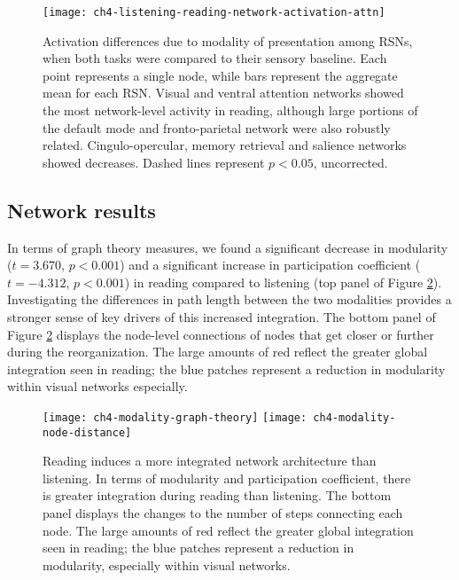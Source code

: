 \begin{figure}[t]
	\centering
	\texttt{[image: ch4-listening-reading-network-activation-attn]}
    \caption[Activation differences due to modality of presentation among RSNs]{Activation differences due to modality of presentation among RSNs, when both tasks were compared to their sensory baseline. Each point represents a single node, while bars represent the aggregate mean for each RSN. Visual and ventral attention networks showed the most network-level activity in reading, although large portions of the default mode and fronto-parietal network were also robustly related. Cingulo-opercular, memory retrieval and salience networks showed decreases. Dashed lines represent $p < 0.05$, uncorrected.}
	\label{fig:ch4-listening-reading-network-activation-attn}
\end{figure}

\subsection{Network results}

In terms of graph theory measures, we found a significant decrease in modularity ($t = 3.670$, $p < 0.001$) and a significant increase in participation coefficient ($t = -4.312$, $p < 0.001$) in reading compared to listening (top panel of Figure \ref{fig:ch4-modality-graph-theory}). Investigating the differences in path length between the two modalities provides a stronger sense of key drivers of this increased integration. The bottom panel of Figure \ref{fig:ch4-modality-graph-theory} displays the node-level connections of nodes that get closer or further during the reorganization. The large amounts of red reflect the greater global integration seen in reading; the blue patches represent a reduction in modularity within visual networks especially.

\begin{figure}[t!]
	\centering
	\texttt{[image: ch4-modality-graph-theory]}
	\texttt{[image: ch4-modality-node-distance]}
    \caption[Reading induces a more integrated network architecture than listening]{Reading induces a more integrated network architecture than listening. In terms of modularity and participation coefficient, there is greater integration during reading than listening. The bottom panel displays the changes to the number of steps connecting each node. The large amounts of red reflect the greater global integration seen in reading; the blue patches represent a reduction in modularity, especially within visual networks.}
	\label{fig:ch4-modality-graph-theory}
\end{figure}



